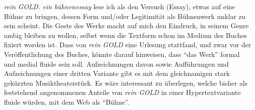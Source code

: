 \documentclass[fontsize=12pt]{scrartcl}
\begin{document}
\textit{rein GOLD. ein b\"uhnenessay} lese ich als den Versuch (Essay), etwas auf eine B\"uhne zu bringen, dessen Form und/oder Le\-gi\-ti\-mi\-t\"at als B\"uhnenwerk unklar zu sein scheint. Die Geste des Werks macht auf mich den Eindruck, in seinem Genre ambig bleiben zu wollen, \mbox{selbst} wenn die Textform schon im Medium des Buches fixiert worden ist. Dass von \textit{rein GOLD} eine Urlesung stattfand, und zwar vor der Ver\"of\-fent\-lichung des Buches, k\"onnte darauf hinweisen, dass "`das Werk"' formal und medial fluide sein soll. Aufzeichnungen davon sowie Auff\"uh\-rungen und Aufzeichnungen einer dritten Variante gibt es mit dem gleichnamigen stark gek\"urzten Musiktheaterst\"uck. Es w\"are interessant zu \"uberlegen, welche bis\-her als feststehend angenommenen Anteile von \textit{rein GOLD} in einer Hypertextvariante fluide w\"urden, mit dem Web als "`B\"uhne"'.
\end{document}
